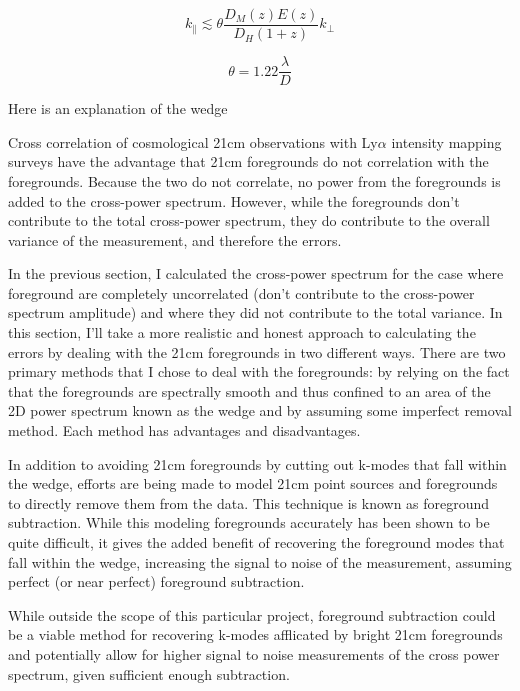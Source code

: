 \begin{equation}
    k_{\parallel} \lesssim  \theta \frac{D_{M}\left( z \right) E \left( z \right)}{D_H \left(1 + z\right)} k_{\perp}
\end{equation}

\begin{equation}
    \theta = 1.22 \frac{\lambda}{D}
\end{equation}

Here is an explanation of the wedge

Cross correlation of cosmological 21cm observations with Ly$\alpha$ intensity
mapping surveys have the advantage that 21cm foregrounds do not correlation with
the foregrounds. Because the two do not correlate, no power from the foregrounds
is added to the cross-power spectrum. However, while the foregrounds don't contribute
to the total cross-power spectrum, they do contribute to the overall variance
of the measurement, and therefore the errors.

In the previous section, I calculated the cross-power spectrum for the case where
foreground are completely uncorrelated (don't contribute to the cross-power spectrum
amplitude) and where they did not contribute to the total variance. In this section,
I'll take a more realistic and honest approach to calculating the errors by dealing
with the 21cm foregrounds in two different ways. There are two primary methods
that I chose to deal with the foregrounds: by relying on the fact that the foregrounds
are spectrally smooth and thus confined to an area of the 2D power spectrum known
as the wedge and by assuming some imperfect removal method. Each method has advantages
and disadvantages.

In addition to avoiding 21cm foregrounds by cutting out k-modes that fall within
the wedge, efforts are being made to model 21cm point sources and foregrounds to
directly remove them from the data. This technique is known as foreground subtraction.
While this modeling foregrounds accurately has been shown to be quite difficult,
it gives the added benefit of recovering the foreground modes that fall within
the wedge, increasing the signal to noise of the measurement, assuming perfect (or
near perfect) foreground subtraction.

While outside the scope of this particular project, foreground subtraction could
be a viable method for recovering k-modes afflicated by bright 21cm foregrounds
and potentially allow for higher signal to noise measurements of the cross power
spectrum, given sufficient enough subtraction.


